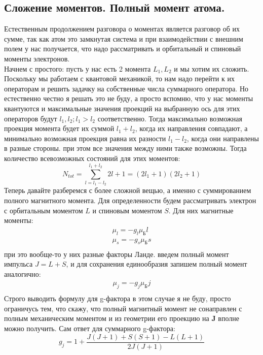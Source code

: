 \documentclass[12pt]{article}
\begin{document}
\subsection{Сложение моментов. Полный момент атома.}
Естественным продолжением разговора о моментах является разговор об их сумме, так как атом это замкнутая система и при взаимодействии с внешним полем у нас получается, что надо рассматривать и орбитальный и спиновый моменты электронов. \\
Начнем с простого: пусть у нас есть 2 момента $L_1, L_2$ и мы хотим их сложить. Поскольку мы работаем с квантовой механикой, то нам надо перейти к их операторам и решить задачку на собственные числа суммарного оператора. Но естественно честно я решать это не буду, а просто вспомню, что у нас моменты квантуются и максимальные значения проекций на выбранную ось для этих операторов будут $l_1, l_2; l_1>l_2$ соответственно. Тогда максимально возможная проекция момента будет их суммой $l_1 + l_2$, когда их направления совпадают, а минимально возможная проекция равна их разности $l_1 - l_2$, когда они направлены в разные стороны. при этом все значения между ними также возможны. Тогда количество всевозможных состояний для этих моментов:
\begin{equation*}
    N_{tot} = \sum\limits_{l=l_1-l_2}^{l_1+l_2}2l+1 = (2l_1+1)(2l_2+1)
\end{equation*}
Теперь давайте разберемся с более сложной вещью, а именно с суммированием полного магнитного момента. Для определенности будем рассматривать электрон с орбитальным моментом $L$ и спиновым моментом $S$. Для них магнитные моменты:
\begin{gather*}
    \mu_l = -g_l\mu_{\text{Б}}l\\
    \mu_s = -g_s\mu_{\text{Б}}s\\
\end{gather*}
при это вообще-то у них разные факторы Ланде. введем полный момент импульса $J = L+S$, и для сохранения единообразия запишем полный момент аналогично: 
\begin{gather*}
    \mu_j = -g_j\mu_{\text{Б}}j\\
\end{gather*}
Строго выводить формулу для g-фактора в этом случае я не буду, просто ограничусь тем, что скажу, что полный магнитный момент не сонаправлен с полным механическим моментом и из геометрии его проекцию на $\textbf{J}$ вполне можно получить. Сам ответ для суммарного g-фактора:
\begin{equation*}
    g_j = 1+\dfrac{J(J+1) + S(S+1) - L(L+1)}{2J(J+1)} 
\end{equation*}
\end{document}
